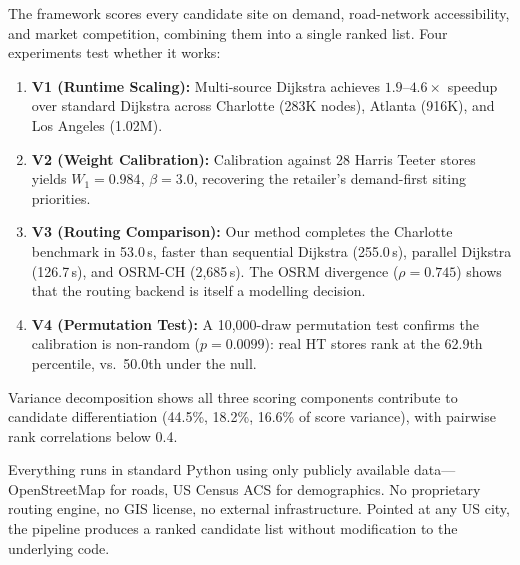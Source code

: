 \documentclass[conference]{IEEEtran}
\begin{document}
The framework scores every candidate site on demand, road-network accessibility, and market competition, combining them into a single ranked list.  Four experiments test whether it works:
\begin{enumerate}
\setlength{\topsep}{0pt}
\setlength{\partopsep}{0pt}
\setlength{\itemsep}{2pt}
    \item \textbf{V1 (Runtime Scaling):}  Multi-source Dijkstra achieves
    $1.9$--$4.6\times$ speedup over standard Dijkstra across Charlotte
    (283K nodes), Atlanta (916K), and Los Angeles (1.02M).

    \item \textbf{V2 (Weight Calibration):}  Calibration against 28
    Harris Teeter stores yields $W_1 = 0.984$, $\beta = 3.0$,
    recovering the retailer's demand-first siting priorities.

    \item \textbf{V3 (Routing Comparison):}  Our method completes the
    Charlotte benchmark in 53.0\,s, faster than sequential Dijkstra
    (255.0\,s), parallel Dijkstra (126.7\,s), and OSRM-CH (2{,}685\,s).
    The OSRM divergence ($\rho = 0.745$) shows that the routing backend
    is itself a modelling decision.

    \item \textbf{V4 (Permutation Test):}  A 10{,}000-draw permutation
    test confirms the calibration is non-random ($p = 0.0099$): real
    HT stores rank at the 62.9th percentile, vs.\ 50.0th under the null.
\end{enumerate}

Variance decomposition shows all three scoring components contribute
to candidate differentiation (44.5\%, 18.2\%, 16.6\% of score
variance), with pairwise rank correlations below 0.4.

Everything runs in standard Python using only publicly available
data---OpenStreetMap for roads, US Census ACS for demographics.  No
proprietary routing engine, no GIS license, no external
infrastructure.  Pointed at any US city, the pipeline produces a
ranked candidate list without modification to the underlying code.
\end{document}

